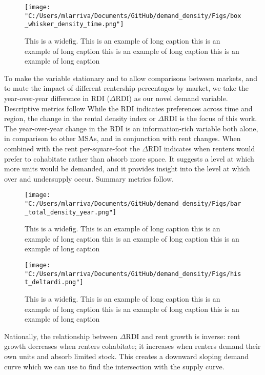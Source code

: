\documentclass[sn-mathphys-num]{sn-jnl}%
\theoremstyle{thmstyleone}%
\theoremstyle{thmstyletwo}%
\theoremstyle{thmstylethree}%
\begin{document}
\begin{figure}[H]
	\centering
	\texttt{[image: "C:/Users/mlarriva/Documents/GitHub/demand\_density/Figs/box\_whisker\_density\_time.png"]}
	\caption{This is a widefig. This is an example of long caption this is an example of long caption  this is an example of long caption this is an example of long caption}\label{fig1}
\end{figure}

To make the variable stationary and to allow comparisons between markets, and to mute the impact of different rentership percentages by market, we take the year-over-year difference in RDI ($\Delta\text{RDI}$) as our novel demand variable. Descriptive metrics follow
While the RDI indicates preferences across time and region, the change in the rental density index or $\Delta\text{RDI}$ is the focus of this work. The year-over-year change in the RDI is an information-rich variable both alone, in comparison to other MSAs, and in conjunction with rent changes. When combined with the rent per-square-foot the $\Delta\text{RDI}$ indicates when renters would prefer to cohabitate rather than absorb more space. It suggests a level at which more units would be demanded, and it provides insight into the level at which over and undersupply occur. 
Summary metrics follow.

\begin{figure}[H]
	\centering
	\texttt{[image: "C:/Users/mlarriva/Documents/GitHub/demand\_density/Figs/bar\_total\_density\_year.png"]}
	\caption{This is a widefig. This is an example of long caption this is an example of long caption  this is an example of long caption this is an example of long caption}\label{fig2}
\end{figure}
\begin{figure}[H]
	\centering
	\texttt{[image: "C:/Users/mlarriva/Documents/GitHub/demand\_density/Figs/hist\_deltardi.png"]}
	\caption{This is a widefig. This is an example of long caption this is an example of long caption  this is an example of long caption this is an example of long caption}\label{fig3}
\end{figure}

Nationally, the relationship between $\Delta\text{RDI}$ and rent growth is inverse: rent growth decreases when renters cohabitate; it increases when renters demand their own units and absorb limited stock. This creates a downward sloping demand curve which we can use to find the intersection with the supply curve. 
\end{document}
